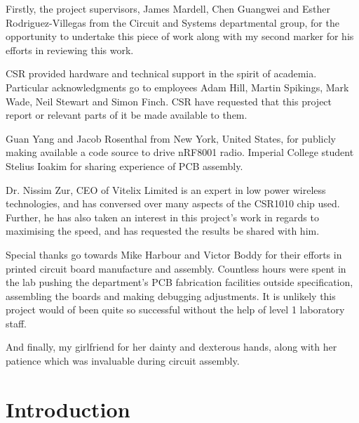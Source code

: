 \documentclass[]{article}
\begin{document}
Firstly, the project supervisors, James Mardell, Chen Guangwei and Esther Rodriguez-Villegas from the Circuit and Systems departmental group, for the opportunity to undertake this piece of work along with my second marker for his efforts in reviewing this work. 

\ac{CSR} provided hardware and technical support in the spirit of academia. Particular acknowledgments go to employees Adam Hill, Martin Spikings, Mark Wade, Neil Stewart and Simon Finch. CSR have requested that this project report or relevant parts of it be made available to them.

Guan Yang and Jacob Rosenthal from New York, United States, for publicly making available a code source to drive nRF8001 radio. Imperial College student Stelius Ioakim for sharing experience of \ac{PCB} assembly. 

Dr. Nissim Zur, CEO of Vitelix Limited is an expert in low power wireless technologies, and has conversed over many aspects of the CSR1010 chip used. Further, he has also taken an interest in this project's work in regards to maximising the speed, and has requested the results be shared with him.

Special thanks go towards Mike Harbour and Victor Boddy for their efforts in printed circuit board manufacture and assembly. Countless hours were spent in the lab pushing the department's PCB fabrication facilities outside specification, assembling the boards and making debugging adjustments. It is unlikely this project would of been quite so successful without the help of level 1 laboratory staff. 

And finally, my girlfriend for her dainty and dexterous hands, along with her patience which was invaluable during circuit assembly. 

\clearpage

\section{Introduction}
\end{document}

